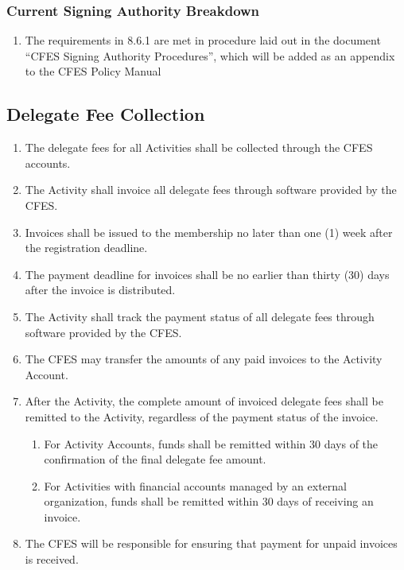 \subsubsection{Current Signing Authority Breakdown}
\label{current-signing-authority-breakdown}

\begin{enumerate}
 \item
  The requirements in 8.6.1 are met in procedure laid out in the document “CFES Signing Authority Procedures”, which will be added as an appendix to the CFES Policy Manual
\end{enumerate}

\subsection{Delegate Fee Collection}
\label{delegate-fee-collection}

\begin{enumerate}
 \item
  The delegate fees for all Activities shall be collected through the CFES accounts.
 \item
  The Activity shall invoice all delegate fees through software provided by the CFES.
 \item
  Invoices shall be issued to the membership no later than one (1) week after the registration deadline.
 \item
  The payment deadline for invoices shall be no earlier than thirty (30) days after the invoice is distributed.
 \item
  The Activity shall track the payment status of all delegate fees through software provided by the CFES.
 \item
  The CFES may transfer the amounts of any paid invoices to the Activity Account.
 \item
  After the Activity, the complete amount of invoiced delegate fees shall be remitted to the Activity, regardless of the payment status of the invoice.

  \begin{enumerate}
   \item
    For Activity Accounts, funds shall be remitted within 30 days of the confirmation of the final delegate fee amount.
   \item
    For Activities with financial accounts managed by an external organization, funds shall be remitted within 30 days of receiving an invoice.
  \end{enumerate}
 \item
  The CFES will be responsible for ensuring that payment for unpaid invoices is received.
\end{enumerate}

